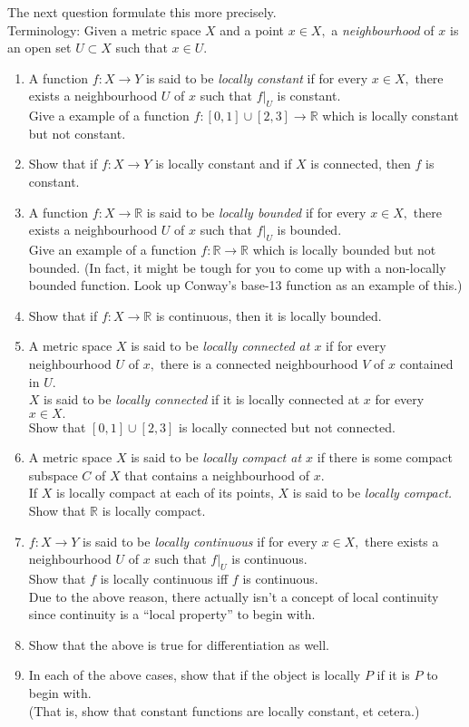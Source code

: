 \documentclass[12pt]{article}
\theoremstyle{definition}
\numberwithin{thm}{section}
\begin{document}
The next question formulate this more precisely.\\
Terminology: Given a metric space $X$ and a point $x \in X,$ a \emph{neighbourhood} of $x$ is an open set $U \subset X$ such that $x \in U.$
\begin{enumerate}
	\item A function $f:X\to Y$ is said to be \emph{locally constant} if for every $x \in X,$ there exists a neighbourhood $U$ of $x$ such that $f|_U$ is constant.\\
	Give a example of a function $f:[0, 1] \cup [2, 3] \to \mathbb{R}$ which is locally constant but not constant.
	\item Show that if $f:X \to Y$ is locally constant and if $X$ is connected, then $f$ is constant.
	\item A function $f:X \to \mathbb{R}$ is said to be \emph{locally bounded} if for every $x \in X,$ there exists a neighbourhood $U$ of $x$ such that $f|_U$ is bounded.\\
	Give an example of a function $f:\mathbb{R} \to \mathbb{R}$ which is locally bounded but not bounded. (In fact, it might be tough for you to come up with a non-locally bounded function. Look up Conway's base-13 function as an example of this.)
	\item Show that if $f:X\to\mathbb{R}$ is continuous, then it is locally bounded.
	\item A metric space $X$ is said to be \emph{locally connected at $x$} if for every neighbourhood $U$ of $x,$ there is a connected neighbourhood $V$ of $x$ contained in $U.$\\
	$X$ is said to be \emph{locally connected} if it is locally connected at $x$ for every $x \in X.$\\
	Show that $[0, 1]\cup[2, 3]$ is locally connected but not connected.
	\item A metric space $X$ is said to be \emph{locally compact at $x$} if there is some compact subspace $C$ of $X$ that contains a neighbourhood of $x.$\\
	If $X$ is locally compact at each of its points, $X$ is said to be \emph{locally compact.}\\
	Show that $\mathbb{R}$ is locally compact.
	\item $f:X\to Y$ is said to be \emph{locally continuous} if for every $x \in X,$ there exists a neighbourhood $U$ of $x$ such that $f|_U$ is continuous.\\
	Show that $f$ is locally continuous iff $f$ is continuous.\\
	Due to the above reason, there actually isn't a concept of local continuity since continuity is a ``local property'' to begin with.
	\item Show that the above is true for differentiation as well.
	\item In each of the above cases, show that if the object is locally $P$ if it is $P$ to begin with.\\
	(That is, show that constant functions are locally constant, et cetera.)
\end{enumerate}
\end{document}
